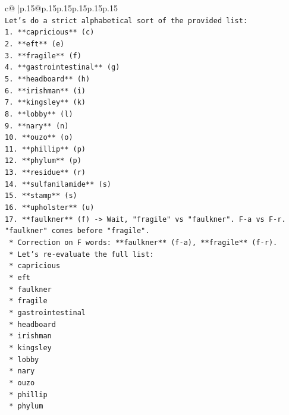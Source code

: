 \documentclass{article}
\begin{document}
{\begin{supertabular}{c@{$\;$}|p{.15\linewidth}@{}p{.15\linewidth}p{.15\linewidth}p{.15\linewidth}p{.15\linewidth}p{.15\linewidth}}
{{{\\ 
\texttt{Let's do a strict alphabetical sort of the provided list:} \\
\texttt{1.  **capricious** (c)} \\
\texttt{2.  **eft** (e)} \\
\texttt{3.  **fragile** (f)} \\
\texttt{4.  **gastrointestinal** (g)} \\
\texttt{5.  **headboard** (h)} \\
\texttt{6.  **irishman** (i)} \\
\texttt{7.  **kingsley** (k)} \\
\texttt{8.  **lobby** (l)} \\
\texttt{9.  **nary** (n)} \\
\texttt{10. **ouzo** (o)} \\
\texttt{11. **phillip** (p)} \\
\texttt{12. **phylum** (p)} \\
\texttt{13. **residue** (r)} \\
\texttt{14. **sulfanilamide** (s)} \\
\texttt{15. **stamp** (s)} \\
\texttt{16. **upholster** (u)} \\
\texttt{17. **faulkner** (f) {-}> Wait, "fragile" vs "faulkner". F{-}a vs F{-}r. "faulkner" comes before "fragile".} \\
\texttt{    *   Correction on F words: **faulkner** (f{-}a), **fragile** (f{-}r).} \\
\texttt{    *   Let's re{-}evaluate the full list:} \\
\texttt{        *   capricious} \\
\texttt{        *   eft} \\
\texttt{        *   faulkner} \\
\texttt{        *   fragile} \\
\texttt{        *   gastrointestinal} \\
\texttt{        *   headboard} \\
\texttt{        *   irishman} \\
\texttt{        *   kingsley} \\
\texttt{        *   lobby} \\
\texttt{        *   nary} \\
\texttt{        *   ouzo} \\
\texttt{        *   phillip} \\
\texttt{        *   phylum} \\
}}}
\end{supertabular}}
\end{document}
